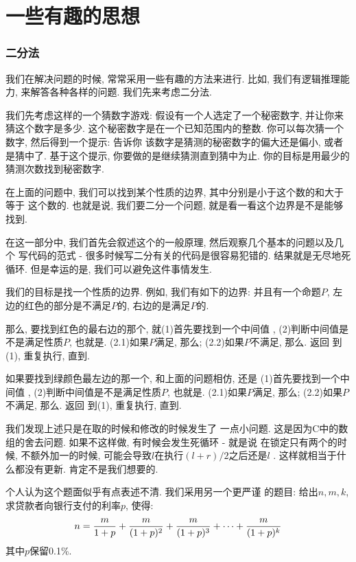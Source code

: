 \part{一些有趣的思想}

\section{二分法}

我们在解决问题的时候, 常常采用一些有趣的方法来进行. 比如, 我们有逻辑推理能力, 
来解答各种各样的问题. 我们先来考虑二分法. 

我们先考虑这样的一个猜数字游戏: 假设有一个人选定了一个秘密数字, 并让你来猜这个数字是多少.
这个秘密数字是在一个已知范围内的整数. 你可以每次猜一个数字, 然后得到一个提示: 告诉你
该数字是猜测的秘密数字的偏大还是偏小, 或者是猜中了. 
基于这个提示, 你要做的是继续猜测直到猜中为止. 你的目标是用最少的猜测次数找到秘密数字. 

在上面的问题中, 我们可以找到某个性质的边界, 其中分别是小于这个数的和大于等于
这个数的. 也就是说, 我们要二分一个问题, 就是看一看这个边界是不是能够找到. 

在这一部分中, 我们首先会叙述这个的一般原理, 然后观察几个基本的问题以及几个
写代码的范式 - 很多时候写二分有关的代码是很容易犯错的. 结果就是无尽地死循环.
但是幸运的是, 我们可以避免这件事情发生. 


 我们的目标是找一个性质的边界. 例如, 我们有如下的边界: 
并且有一个命题$P$, 左边的红色的部分是不满足$P$的, 右边的是满足$P$的. 

那么, 要找到红色的最右边的那个, 就(1)首先要找到一个中间值
, (2)判断中间值是不是满足性质$P$, 也就是. (2.1)如果$P$满足, 
那么; (2.2)如果$P$不满足, 那么. 返回
到(1), 重复执行, 直到. 

如果要找到绿颜色最左边的那一个, 和上面的问题相仿, 还是
(1)首先要找到一个中间值
, (2)判断中间值是不是满足性质$P$, 也就是. (2.1)如果$P$满足, 
那么; (2.2)如果$P$不满足, 那么. 返回
到(1), 重复执行, 直到. 

我们发现上述只是在取的时候和修改的时候发生了
一点小问题. 这是因为C中的数组的舍去问题. 如果不这样做, 有时候会发生死循环 - 就是说
在锁定只有两个的时候, 不额外加一的时候, 可能会导致$l$在执行$(l+r)/2$之后还是$l$
. 这样就相当于什么都没有更新. 肯定不是我们想要的. 


 个人认为这个题面似乎有点表述不清. 我们采用另一个更严谨
的题目: 给出$n,m,k$, 求贷款者向银行支付的利率$p$, 使得: 
$$
n={m\over 1+p} +{m\over (1+p)^2}+{m\over (1+p)^3}+\cdots + {m\over (1+p)^k} 
$$
其中$p$保留0.1\%.  

